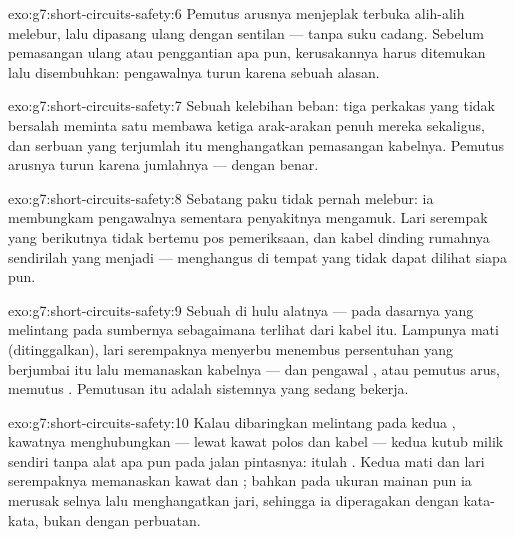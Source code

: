 \begin{solution}{exo:g7:short-circuits-safety:6}
Pemutus arusnya menjeplak terbuka alih-alih melebur, lalu dipasang
ulang dengan sentilan --- tanpa suku cadang. Sebelum pemasangan ulang
atau penggantian apa pun, kerusakannya harus ditemukan lalu
disembuhkan: pengawalnya turun karena sebuah alasan.
\end{solution}

\begin{solution}{exo:g7:short-circuits-safety:7}
Sebuah kelebihan beban: tiga perkakas yang tidak bersalah meminta satu
 membawa ketiga arak-arakan penuh mereka sekaligus, dan serbuan
yang terjumlah itu menghangatkan pemasangan kabelnya. Pemutus arusnya
turun karena jumlahnya --- dengan benar.
\end{solution}

\begin{solution}{exo:g7:short-circuits-safety:8}
Sebatang paku tidak pernah melebur: ia membungkam pengawalnya
sementara penyakitnya mengamuk. Lari serempak yang berikutnya tidak
bertemu pos pemeriksaan, dan kabel dinding rumahnya sendirilah yang
menjadi  --- menghangus di tempat yang tidak dapat dilihat
siapa pun.
\end{solution}

\begin{solution}{exo:g7:short-circuits-safety:9}
Sebuah  di hulu alatnya --- pada dasarnya  yang
melintang pada sumbernya sebagaimana terlihat dari kabel itu. Lampunya
mati (ditinggalkan), lari serempaknya menyerbu menembus persentuhan
yang berjumbai itu lalu memanaskan kabelnya --- dan pengawal
,  atau pemutus arus, memutus . Pemutusan itu
adalah sistemnya yang sedang bekerja.
\end{solution}

\begin{solution}{exo:g7:short-circuits-safety:10}
Kalau dibaringkan melintang pada kedua , kawatnya
menghubungkan --- lewat kawat polos dan kabel  --- kedua
kutub milik  sendiri tanpa alat apa pun pada jalan
pintasnya: itulah  . Kedua  mati dan lari
serempaknya memanaskan kawat dan ; bahkan pada ukuran mainan
pun ia merusak selnya lalu menghangatkan jari, sehingga ia diperagakan
dengan kata-kata, bukan dengan perbuatan.
\end{solution}

